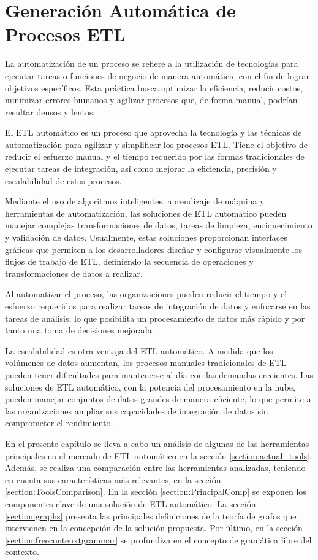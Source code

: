\chapter{Generaci\'on Autom\'atica de Procesos ETL}\label{chapter:auto-etl}

La automatización de un proceso se refiere a la utilización de tecnologías para ejecutar tareas o funciones de 
negocio de manera automática, con el fin de lograr objetivos 
específicos. Esta práctica busca optimizar la eficiencia, reducir costos, minimizar errores humanos y agilizar 
procesos que, de forma manual, podrían resultar densos y lentos.

El ETL automático es un proceso que 
aprovecha la tecnología y las técnicas de automatización para agilizar y simplificar los procesos ETL. Tiene el objetivo 
de reducir el esfuerzo manual y el tiempo requerido por las formas tradicionales de ejecutar tareas de integración, 
as\'i como mejorar la eficiencia, precisión y escalabilidad de estos procesos.

Mediante el uso de algoritmos inteligentes, aprendizaje de m\'aquina y herramientas de automatización, las soluciones de 
ETL automático pueden manejar complejas transformaciones de datos, tareas de limpieza, enriquecimiento 
y validación de datos. Usualmente, estas soluciones proporcionan interfaces gráficas que permiten a los 
desarrolladores diseñar y configurar visualmente los flujos de trabajo de ETL, definiendo la secuencia de operaciones y 
transformaciones de datos a realizar.

Al automatizar el proceso, las 
organizaciones pueden reducir el tiempo y el esfuerzo requeridos para realizar tareas de integración de 
datos y enfocarse en las tareas de an\'alisis, lo que posibilita un procesamiento de datos más rápido y 
por tanto una toma de decisiones mejorada.

La escalabilidad es otra ventaja del ETL automático. A medida que los volúmenes de datos aumentan, los procesos manuales 
tradicionales de ETL pueden tener dificultades para mantenerse al día con las demandas crecientes. Las soluciones de ETL 
automático, con la potencia del procesamiento en la nube, pueden manejar conjuntos de datos grandes de manera eficiente, 
lo que permite a las organizaciones ampliar sus capacidades de integración de datos sin comprometer el rendimiento.

En el presente cap\'itulo se lleva a cabo un análisis de algunas de las herramientas principales en el 
mercado de ETL automático en la sección \ref{section:actual_tools}. Además, se realiza una comparación entre las 
herramientas analizadas, teniendo en cuenta sus características más relevantes, en la sección 
\ref{section:ToolsComparison}. En la sección \ref{section:PrincipalComp} se exponen los componentes clave de 
una solución de ETL automático. La sección \ref{section:graphs} presenta las principales definiciones de la 
teoría de grafos que intervienen en la concepción de la solución propuesta. Por \'ultimo, en la sección 
\ref{section:freecontenxtgrammar} se profundiza en el concepto de gramática libre del contexto.






